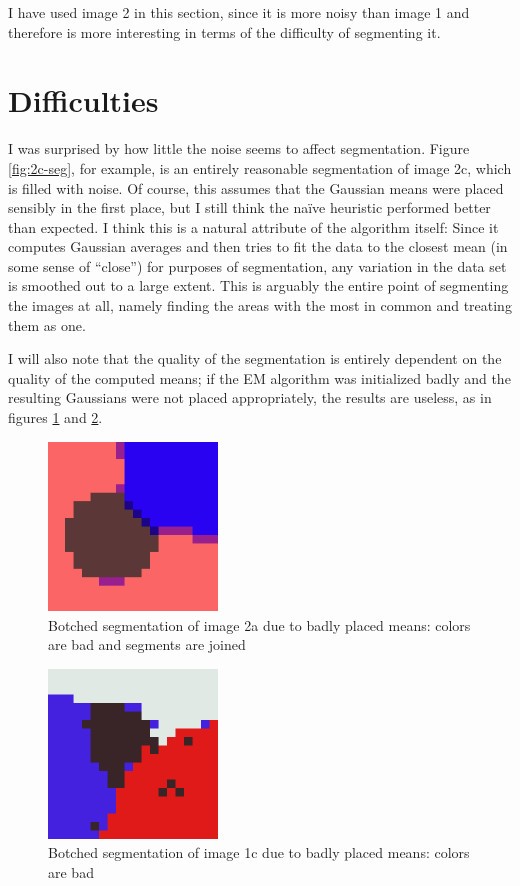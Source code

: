 \documentclass[letterpaper, 10pt, twocolumn]{article}
\numberwithin{theorem}{section}
\begin{document}
I have used image 2 in this section, since it is more noisy than image 1 and therefore is more interesting in terms of the difficulty of segmenting it.




\section{Difficulties} 
I was surprised by how little the noise seems to affect segmentation. 
Figure \ref{fig:2c-seg}, for example, is an entirely reasonable segmentation of image 2c, which is filled with noise.
Of course, this assumes that the Gaussian means were placed sensibly in the first place, but I still think the naïve heuristic performed better than expected. 
I think this is a natural attribute of the algorithm itself: 
Since it computes Gaussian averages and then tries to fit the data to the closest mean (in some sense of ``close'') for purposes of segmentation, any variation in the data set is smoothed out to a large extent. 
This is arguably the entire point of segmenting the images at all, namely finding the areas with the most in common and treating them as one.

I will also note that the quality of the segmentation is entirely dependent on the quality of the computed means; if the EM algorithm was initialized badly and the resulting Gaussians were not placed appropriately, the results are useless, as in figures \ref{fig:2a-seg-bad} and \ref{fig:1c-seg-bad}.

\begin{figure}[h]
	\centering
	\includegraphics[width=0.4\textwidth]{2a-seg-bad}
	\caption{Botched segmentation of image 2a due to badly placed means: colors are bad and segments are joined}
	\label{fig:2a-seg-bad}
\end{figure}

\begin{figure}[h]
	\centering
	\includegraphics[width=0.4\textwidth]{1c-seg-bad}
	\caption{Botched segmentation of image 1c due to badly placed means: colors are bad}
	\label{fig:1c-seg-bad}
\end{figure}
\end{document}
